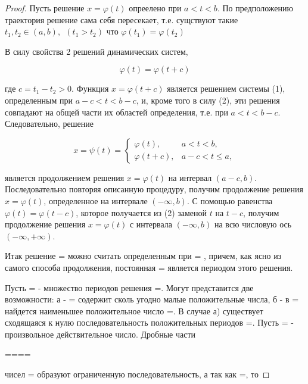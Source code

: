 \documentclass{article}
\theoremstyle{plain} \newtheorem*{theorem*}{Теорема}
\theoremstyle{plain} \newtheorem{theorem}{Теорема}[section]
\begin{document}
\begin{proof}

    Пусть решение $x = \varphi(t)$ опреелено при $a < t < b$.
    По предположению траектория решение сама себя пересекает, т.е. сущствуют такие
    $t_1,t_2 \in (a,b) ,\ \ (t_1 > t_2)$ что $\varphi(t_1) = \varphi(t_2)$

    В силу свойства 2 решений динамических систем,

    \begin{equation}
        \varphi(t) = \varphi(t + c)
    \end{equation}

    где $c = t_1 - t_2 > 0$.
    Функция $x = \varphi(t+c)$ является решением системы (1),
    определенным при $a-c < t < b-c$, и, кроме того в силу (2),
    эти решения совпадают на общей части их областей определения,
    т.е. при $a < t < b-c$. Следовательно, решение

    \begin{equation}
        x = \psi(t) =
        \begin{cases}
            \varphi(t), &a < t < b,\\
            \varphi(t + c), & a-c < t \le a,
        \end{cases}
    \end{equation}

    является продолжением решения $x = \varphi(t)$ на интервал $(a-c, b)$.
    Последовательно повторяя описанную процедуру, получим продолжение
    решения $x = \varphi(t)$, определенное на интервале $(- \infty, b)$.
\newline
    С помощью равенства $\varphi(t) = \varphi(t - c)$, которое
    получается из (2) заменой $t$ на $t - c$, получим продолжение
    решения $x = \varphi(t)$ с интервала $(- \infty, b)$ на всю
    числовую ось $(-\infty, +\infty)$.

    Итак решение =  можно считать определенным при = , причем,
    как ясно из самого способа продолжения, постоянная = является
    периодом этого решения.

    Пусть = - множество периодов решения =. Могут представится две возможности:
    а - = содержит сколь угодно малые положительные числа,
    б - в = найдется наименьшее положительное число =.
    В случае а) существует сходящаяся к нулю последовательность положительных
    периодов =.
    Пусть = - произвольное действительное число. Дробные части

    ====

    чисел = образуют ограниченную последовательность, а так как =, то


\end{proof}
\end{document}
